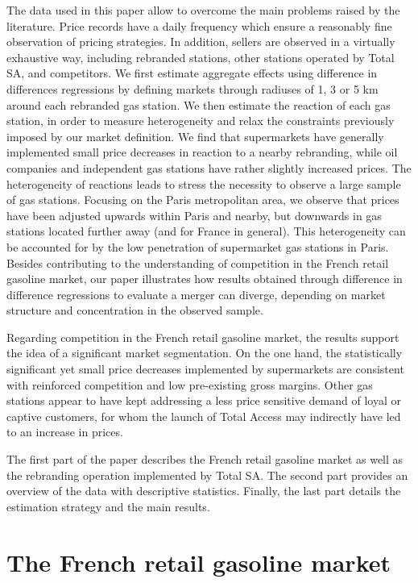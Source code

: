 \documentclass[english]{article}
\begin{document}
The data used in this paper allow to overcome the main problems raised by the literature. Price records have a daily frequency which ensure a reasonably fine observation of pricing strategies. In addition, sellers are observed in a virtually exhaustive way, including rebranded stations, other stations operated by Total SA, and competitors. We first estimate aggregate effects using difference in differences regressions by defining markets through radiuses of 1, 3 or 5 km around each rebranded gas station. We then estimate the reaction of each gas station, in order to measure heterogeneity and relax the constraints previously imposed by our market definition. We find that supermarkets have generally implemented small price decreases in reaction to a nearby rebranding, while oil companies and independent gas stations have rather slightly increased prices. The heterogeneity of reactions leads to stress the necessity to observe a large sample of gas stations. Focusing on the Paris metropolitan area, we observe that prices have been adjusted upwards within Paris and nearby, but downwards in gas stations located further away (and for France in general). This heterogeneity can be accounted for by the low penetration of supermarket gas stations in Paris. Besides contributing to the understanding of competition in the French retail gasoline market, our paper illustrates how results obtained through difference in difference regressions to evaluate a merger can diverge, depending on market structure and concentration in the observed sample.
\medskip{}

Regarding competition in the French retail gasoline market, the results support the idea of a significant market segmentation. On the one hand, the statistically significant yet small price decreases implemented by supermarkets are consistent with reinforced competition and low pre-existing gross margins. Other gas stations appear to have kept addressing a less price sensitive demand of loyal or captive customers, for whom the launch of Total Access may indirectly have led to an increase in prices.
\medskip{}

The first part of the paper describes the French retail gasoline market as well as the rebranding operation implemented by Total SA. The second part provides an overview of the data with descriptive statistics. Finally, the last part details the estimation strategy and the main results.

\section{The French retail gasoline market}
\end{document}
